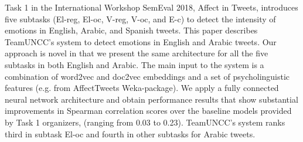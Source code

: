 Task 1 in the International Workshop SemEval 2018, Affect in Tweets, introduces five subtasks (El-reg, El-oc, V-reg, V-oc, and E-c) to detect the intensity of emotions in English, Arabic, and Spanish tweets. This paper describes TeamUNCC's system to detect emotions in English and Arabic tweets. Our approach is novel in that we present the same architecture for all the five subtasks in both English and Arabic. The main input to the system is a combination of word2vec and doc2vec embeddings and a set of psycholinguistic features (e.g. from AffectTweets Weka-package). We apply a fully connected neural network architecture and obtain performance results that show substantial improvements in Spearman correlation scores over the baseline models provided by Task 1 organizers, (ranging from 0.03 to 0.23). TeamUNCC's system ranks third in subtask El-oc and fourth in other subtasks for Arabic tweets.
